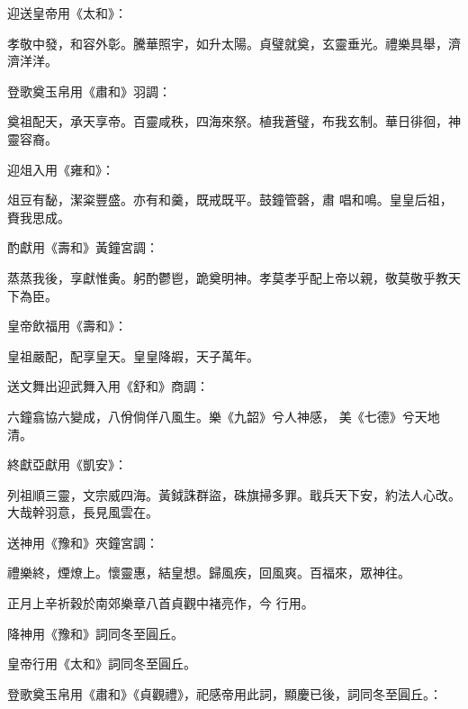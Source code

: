 \begin{pinyinscope}
 迎送皇帝用《太和》：



 孝敬中發，和容外彰。騰華照宇，如升太陽。貞璧就奠，玄靈垂光。禮樂具舉，濟濟洋洋。



 登歌奠玉帛用《肅和》羽調：



 奠祖配天，承天享帝。百靈咸秩，四海來祭。植我蒼璧，布我玄制。華日徘徊，神靈容裔。



 迎俎入用《雍和》：



 俎豆有馝，潔粢豐盛。亦有和羹，既戒既平。鼓鐘管磬，肅
 唱和鳴。皇皇后祖，賚我思成。



 酌獻用《壽和》黃鐘宮調：



 蒸蒸我後，享獻惟夤。躬酌鬱鬯，跪奠明神。孝莫孝乎配上帝以親，敬莫敬乎教天下為臣。



 皇帝飲福用《壽和》：



 皇祖嚴配，配享皇天。皇皇降嘏，天子萬年。



 送文舞出迎武舞入用《舒和》商調：



 六鐘翕協六變成，八佾倘佯八風生。樂《九韶》兮人神感，
 美《七德》兮天地清。



 終獻亞獻用《凱安》：



 列祖順三靈，文宗威四海。黃鉞誅群盜，硃旗掃多罪。戢兵天下安，約法人心改。大哉幹羽意，長見風雲在。



 送神用《豫和》夾鐘宮調：



 禮樂終，煙燎上。懷靈惠，結皇想。歸風疾，回風爽。百福來，眾神往。



 正月上辛祈穀於南郊樂章八首貞觀中褚亮作，今
 行用。



 降神用《豫和》詞同冬至圓丘。



 皇帝行用《太和》詞同冬至圓丘。



 登歌奠玉帛用《肅和》《貞觀禮》，祀感帝用此詞，顯慶已後，詞同冬至圓丘。：




\end{pinyinscope}
